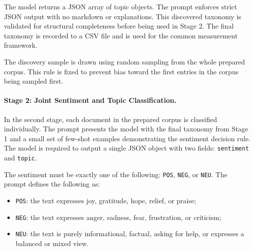 \documentclass[12pt,a4paper]{report}
\begin{document}
The model returns a JSON array of topic objects. The prompt enforces strict
JSON output with no markdown or explanations. This discovered taxonomy is
validated for structural completeness before being used in Stage 2. The final
taxonomy is recorded to a CSV file and is used for the common measurement
framework.

The discovery sample is drawn using random sampling from the whole prepared
corpus. This rule is fixed to prevent bias toward the first entries in the
corpus being sampled first.

\paragraph{Stage 2: Joint Sentiment and Topic Classification.}
In the second stage, each document in the prepared corpus is classified
individually. The prompt presents the model with the final taxonomy from
Stage 1 and a small set of few-shot examples demonstrating the sentiment
decision rule. The model is required to output a single JSON object with two
fields: \texttt{sentiment} and \texttt{topic}.

The sentiment must be exactly one of the following: \texttt{POS},
\texttt{NEG}, or \texttt{NEU}. The prompt defines the following as:
\begin{itemize}
  \item \texttt{POS}: the text expresses joy, gratitude, hope, relief, or praise;
  \item \texttt{NEG}: the text expresses anger, sadness, fear, frustration, or criticism;
  \item \texttt{NEU}: the text is purely informational, factual, asking for
        help, or expresses a balanced or mixed view.
\end{itemize}
\end{document}
